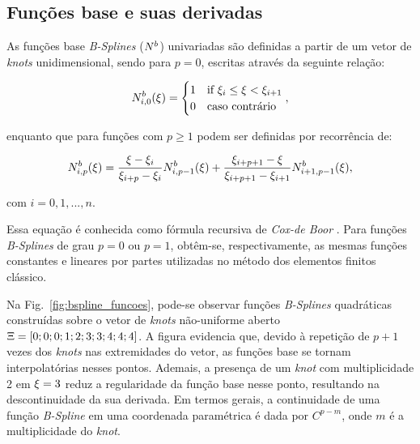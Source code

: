 \documentclass[tese_patricia]{subfiles}
\begin{document}
\subsection{Funções base e suas derivadas}

As funções base \textit{B-Splines} ($N^b$) univariadas são definidas a partir de um vetor de \textit{knots} unidimensional, sendo para $p=0$, escritas através da seguinte relação:

\begin{align}
N^b_{i,0}(\xi) = \begin{cases} 1 &\mbox{if } \xi_i\leq\xi<\xi_{i+1} \\
0 & \mbox{caso contrário } \end{cases}, \label{eq:bsplines_0}
\end{align}

\noindent enquanto que para funções com $p \geq 1$ podem ser definidas por recorrência de:

\begin{align}
N^b_{i,p}(\xi)=\frac{\xi-\xi_{i}}{\xi_{i+p}-\xi_{i}}N^b_{i,p-1}(\xi) + 
\frac{\xi_{i+p+1}-\xi}{\xi_{i+p+1}-\xi_{i+1}}N^b_{i+1,p-1}(\xi), \label{eq:bsplines_n}
\end{align}

\noindent com $i=0,1,...,n$.

Essa equação é conhecida como fórmula recursiva de \textit{Cox-de Boor} \cite{Cox1972,DEBOOR1972}. Para funções \textit{B-Splines} de grau $p=0$ ou $p=1$, obtêm-se, respectivamente, as mesmas funções constantes e lineares por partes utilizadas no método dos elementos finitos clássico.

Na Fig.~\ref{fig:bspline_funcoes}, pode-se observar funções \textit{B-Splines} quadráticas construídas sobre o vetor de \textit{knots} não-uniforme aberto $\Xi=\left[0; 0; 0; 1; 2; 3; 3; 4; 4; 4\right]$. A figura evidencia que, devido à repetição de $p+1$ vezes dos \textit{knots} nas extremidades do vetor, as funções base se tornam interpolatórias nesses pontos. Ademais, a presença de um \textit{knot} com multiplicidade 2 em $\xi=3$ reduz a regularidade da função base nesse ponto, resultando na descontinuidade da sua derivada. Em termos gerais, a continuidade de uma função \textit{B-Spline} em uma coordenada paramétrica é dada por $C^{p-m}$, onde $m$ é a multiplicidade do \textit{knot}.
\end{document}
